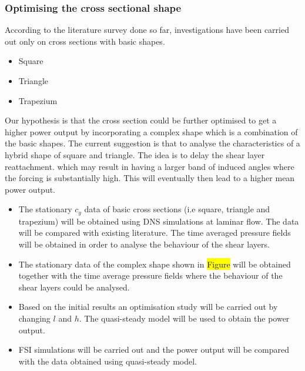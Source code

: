 \documentclass{article}
\newcommand{\hilight}[1]{\colorbox{yellow}{#1}}
\begin{document}
\subsubsection{Optimising the cross sectional shape}
According to the literature survey done so far, investigations have been carried out only on cross sections with basic shapes. 

\begin{itemize}
\item{Square}
\item{Triangle}
\item{Trapezium}
\end{itemize}
   
Our hypothesis is that the cross section could be further optimised to get a higher power output by incorporating a complex shape which is a combination of the basic shapes. The current suggestion is that to analyse the characteristics of a hybrid shape of square and triangle. The idea is to delay the shear layer reattachment. which may result in having a larger band of induced angles where the forcing is substantially high. This will eventually then lead to a higher mean power output.

\begin{itemize}
\item{The stationary $c_y$ data of basic cross sections (i.e square, triangle and trapezium) will be obtained using DNS simulations at laminar flow. The data will be compared with existing literature. The time averaged pressure fields will be obtained in order to analyse the behaviour of the shear layers.}
\item{The stationary data of the complex shape shown in \hilight{Figure} will be obtained together with the time average pressure fields where the behaviour of the shear layers could be analysed.}
\item{Based on the initial results an optimisation study will be carried out by changing $l$ and $h$. The quasi-steady model will be used to obtain the power output.}
\item{FSI simulations will be carried out and the power output will be compared with the data obtained using quasi-steady model.}
\end{itemize}  


 
 






 

\end{document}
